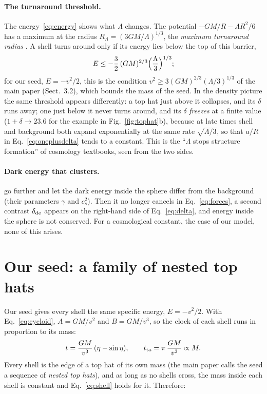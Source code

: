 \documentclass[11pt,a4paper]{article}
\begin{document}
\paragraph{The turnaround threshold.} The energy~\eqref{eq:energy} shows
what $\Lambda$ changes. The potential $-GM/R-\Lambda R^{2}/6$ has a
maximum at the radius $R_{\Lambda}=(3GM/\Lambda)^{1/3}$, the
\emph{maximum turnaround radius} \citep{Pavlidou2014}. A shell turns
around only if its energy lies below the top of this barrier,
\begin{equation}
  E\le-\frac32\,(GM)^{2/3}\Bigl(\frac{\Lambda}{3}\Bigr)^{1/3};
  \label{eq:threshold}
\end{equation}
for our seed, $E=-v^{2}/2$, this is the condition
$v^{2}\ge3(GM)^{2/3}(\Lambda/3)^{1/3}$ of the main paper (Sect.~3.2),
which bounds the mass of the seed. In the density picture the same
threshold appears differently: a top hat just above it collapses, and its
$\delta$ runs away; one just below it never turns around, and its
$\delta$ \emph{freezes} at a finite value ($1+\delta\to23.6$ for the
example in Fig.~\ref{fig:tophat}b), because at late times shell and
background both expand exponentially at the same rate
$\sqrt{\Lambda/3}$, so that $a/R$ in Eq.~\eqref{eq:oneplusdelta} tends to
a constant. This is the ``$\Lambda$ stops structure formation'' of
cosmology textbooks, seen from the two sides.

\paragraph{Dark energy that clusters.} \citet{Herrera2019} go further and
let the dark energy inside the sphere differ from the background
(their parameters $\gamma$ and $c_{s}^{2}$). Then it no longer cancels
in Eq.~\eqref{eq:forces}, a second contrast $\delta_{\rm de}$ appears on
the right-hand side of Eq.~\eqref{eq:delta}, and energy inside the sphere
is not conserved. For a cosmological constant, the case of our model,
none of this arises.

\section{Our seed: a family of nested top hats}\label{sec:seed}

Our seed gives every shell the same specific energy, $E=-v^{2}/2$. With
Eq.~\eqref{eq:cycloid}, $A=GM/v^{2}$ and $B=GM/v^{3}$, so the clock of
each shell runs in proportion to its mass:
\begin{equation}
  t=\frac{GM}{v^{3}}\,(\eta-\sin\eta),\qquad
  t_{\rm ta}=\pi\,\frac{GM}{v^{3}}\propto M .
  \label{eq:seedclock}
\end{equation}
Every shell is the edge of a top hat of its own mass (the main paper
calls the seed a sequence of \emph{nested top hats}), and as long as no
shells cross, the mass inside each shell is constant and
Eq.~\eqref{eq:shell} holds for it. Therefore:
\end{document}
